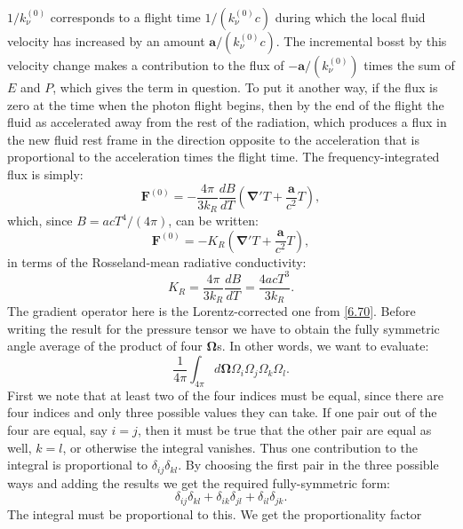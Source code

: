 \documentclass[letterpaper]{report}
\newcommand\bn{\boldsymbol{\nabla}}
\newcommand\bo{\boldsymbol{\Omega}}
\newcommand\bs{\boldsymbol}
\renewcommand{\(}{\left(}
\renewcommand{\)}{\right)}
\renewcommand{\[}{\left[}
\renewcommand{\]}{\right]}
\begin{document}
$1/k_{\nu}^{(0)}$ corresponds to a flight time $1/\(k_{\nu}^{(0)}c\)$ during
which the local fluid velocity has increased by an amount
$\bs{a}/\(k_{\nu}^{(0)}c\)$. The incremental bosst by this velocity change
makes a contribution to the flux of $-\bs{a}/\(k_{\nu}^{(0)}\)$ times the sum
of $E$ and $P$, which gives the term in question. To put it another way, if
the flux is zero at the time when the photon flight begins, then by the end of
the flight the fluid as accelerated away from the rest of the radiation, which
produces a flux in the new fluid rest frame in the direction opposite to the
acceleration that is proportional to the acceleration times the flight time.
The frequency-integrated flux is simply:
\begin{equation}
  \bs{F}^{(0)} = -\frac{4\pi}{3k_R}\frac{dB}{dT}\(\bn'T+\frac{\bs{a}}{c^2}T\),
  \label{6.71}
\end{equation}
which, since $B=acT^4/(4\pi)$, can be written:
\begin{equation}
  \bs{F}^{(0)} = -K_R\(\bn'T+\frac{\bs{a}}{c^2}T\),
  \label{6.72}
\end{equation}
in terms of the Rosseland-mean radiative conductivity:
\begin{equation}
  K_R = \frac{4\pi}{3k_R}\frac{dB}{dT}=\frac{4acT^3}{3k_R}.
  \label{6.73}
\end{equation}
The gradient operator here is the Lorentz-corrected one from \cref{6.70}.
Before writing the result for the pressure tensor we have to obtain the fully
symmetric angle average of the product of four $\bo$s. In other words, we want
to evaluate:
\begin{equation}
  \frac{1}{4\pi}\int_{4\pi}d\bo \Omega_i\Omega_j\Omega_k\Omega_l.
  \label{6.74}
\end{equation}
First we note that at least two of the four indices must be equal, since there
are four indices and only three possible values they can take. If one pair out
of the four are equal, say $i=j$, then it must be true that the other pair are
equal as well, $k=l$, or otherwise the integral vanishes. Thus one
contribution to the integral is proportional to $\delta_{ij}\delta_{kl}$. By
choosing the first pair in the three possible ways and adding the results we
get the required fully-symmetric form:
\begin{equation}
  \delta_{ij}\delta_{kl}+\delta_{ik}\delta_{jl}+\delta_{il}\delta_{jk}.
  \label{6.75}
\end{equation}
The integral must be proportional to this. We get the proportionality factor
\end{document}
